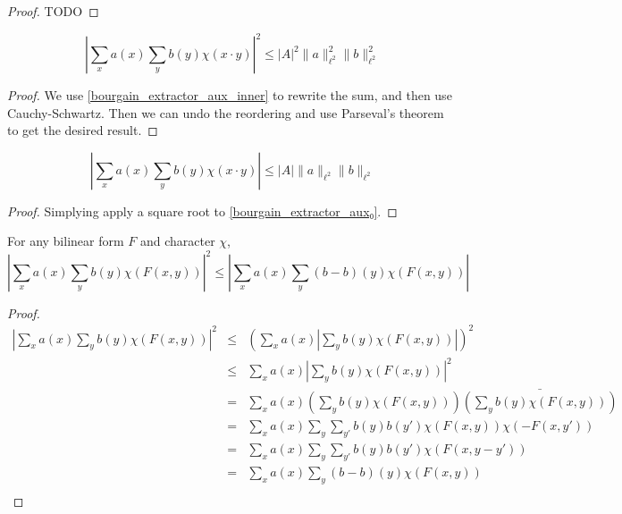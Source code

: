 \begin{proof}
    \leanok
    TODO
\end{proof}

\begin{theorem}
    \label{bourgain_extractor_aux₀}
    \leanok

    $$|\sum_x{a(x)\sum_y{b(y) \chi(x \cdot y)}}|^2 \leq |A|^2 \lVert a \rVert_{\ell^2}^2 \lVert b \rVert_{\ell^2}^2$$
\end{theorem}

\begin{proof}
    \leanok
    We use \ref{bourgain_extractor_aux_inner} to rewrite the sum, and then use Cauchy-Schwartz.
    Then we can undo the reordering and use Parseval's theorem to get the desired result.
\end{proof}

\begin{theorem}
    \label{bourgain_extractor_aux₀t}
    \leanok

    $$|\sum_x{a(x)\sum_y{b(y) \chi(x \cdot y)}}| \leq |A| \lVert a \rVert_{\ell^2} \lVert b \rVert_{\ell^2}$$
\end{theorem}

\begin{proof}
    \leanok
    Simplying apply a square root to \ref{bourgain_extractor_aux₀}.
\end{proof}

\begin{theorem}
    \label{bourgain_extractor_aux₁}
    \leanok
    For any bilinear form $F$ and character $\chi$,
    $$|\sum_x{a(x) \sum_y{b(y) \chi(F(x, y))}}|^2 \leq |\sum_x{a(x) \sum_y{(b-b)(y) \chi(F(x, y))}}|$$
\end{theorem}

\begin{proof}
    \leanok
    \begin{align}
        |\sum_x{a(x) \sum_y{b(y) \chi(F(x, y))}}|^2 &\leq& (\sum_x{a(x) |\sum_y{b(y) \chi(F(x, y))} | })^2 \\
        &\leq& \sum_x{a(x) |\sum_y{b(y) \chi(F(x, y))} |^2}\\
        &=&\sum_x{a(x) (\sum_y{b(y) \chi(F(x, y))}) \bar{(\sum_y{b(y) \chi(F(x, y))})}} \\
        &=&\sum_x{a(x) \sum_y \sum_{y'}{b(y) b(y') \chi(F(x, y)) \chi(-F(x, y'))} } \\
        &=&\sum_x{a(x) \sum_y \sum_{y'}{b(y) b(y') \chi(F(x, y - y'))} } \\
        &=&\sum_x{a(x) \sum_y{(b-b)(y) \chi(F(x, y))} } \\
    \end{align}
\end{proof}


